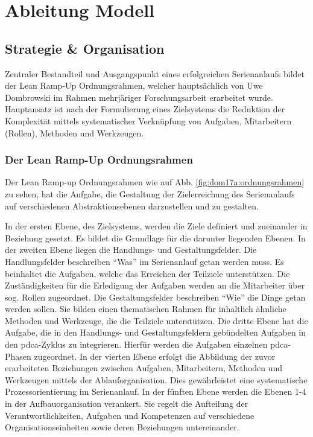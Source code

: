 \chapter{Ableitung Modell}\label{sec:ableitung}

\section{Strategie \& Organisation}

Zentraler Bestandteil und Ausgangspunkt eines erfolgreichen Serienanlaufs bildet der Lean Ramp-Up Ordnungsrahmen, welcher hauptsächlich von Uwe Dombrowski im Rahmen mehrjäriger Forschungsarbeit erarbeitet wurde. Hauptansatz ist nach der Formulierung eines Zielsystems die Reduktion der Komplexität mittels systematischer Verknüpfung von Aufgaben, Mitarbeitern (Rollen), Methoden und Werkzeugen. 

\subsection*{Der Lean Ramp-Up Ordnungsrahmen}
 Der Lean Ramp-up Ordnungsrahmen wie auf Abb. \ref{fig:dom17a:ordnungsrahmen} zu sehen, hat die Aufgabe, die Gestaltung der Zielerreichung des Serienanlaufs auf verschiedenen Abstraktionsebenen darzustellen und zu gestalten. 
 
In der ersten Ebene, des Zielsystems, werden die Ziele definiert und zueinander in Beziehung gesetzt. Es bildet die Grundlage für die darunter liegenden Ebenen. 
% 
In der zweiten Ebene liegen die Handlungs- und Gestaltungsfelder. Die Handlungsfelder beschreiben ``Was'' im Serienanlauf getan werden muss. 
Es beinhaltet die Aufgaben, welche das Erreichen der Teilziele unterstützen. Die Zuständigkeiten für die Erledigung der Aufgaben werden an die Mitarbeiter über sog. Rollen zugeordnet.
Die Gestaltungsfelder beschreiben ``Wie'' die Dinge getan werden sollen. Sie bilden einen thematischen Rahmen für inhaltlich ähnliche Methoden und Werkzeuge, die die Teilziele unterstützen.
% 
Die dritte Ebene hat die Aufgabe, die in den Handlungs- und Gestaltungsfeldern gebündelten Aufgaben in den \gls{pdca}-Zyklus zu integrieren. Hierfür werden die Aufgaben einzelnen \gls{pdca}-Phasen zugeordnet. 
% 
In der vierten Ebene erfolgt die Abbildung der zuvor erarbeiteten Beziehungen zwischen Aufgaben, Mitarbeitern, Methoden und Werkzeugen mittels der Ablauforganisation.  Dies gewährleistet eine systematische Prozessorientierung im Serienanlauf. 
% 
In der fünften Ebene werden die Ebenen 1-4 in der Aufbauorganisation verankert. Sie regelt die Aufteilung der Verantwortlichkeiten, Aufgaben und Kompetenzen auf verschiedene Organisationseinheiten sowie deren Beziehungen untereinander. 

